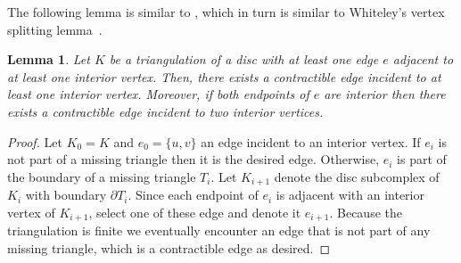 \documentclass[11pt]{article}
\newtheorem{lemma}[theorem]{Lemma}
\numberwithin{claimcounter}{theorem}
\theoremstyle{remark}
\theoremstyle{definition}
\numberwithin{theorem}{section}
\begin{document}
%
The following lemma is similar to \cite[Lemma 4.10]{keehn24-exterior}, which in turn is similar to Whiteley's vertex splitting lemma~\cite{whiteley90-split}.  
\begin{lemma}
  \label{l:interior-edge}
  Let $K$ be a triangulation of a disc with at least one edge $e$ adjacent to at least one interior vertex. 
  Then, there exists a contractible edge incident to at least one interior vertex.
  Moreover, if both endpoints of $e$ are interior then there exists a contractible edge incident to two interior vertices.
\end{lemma}
\begin{proof}
  Let $K_0 = K$ and $e_0=\{u,v\}$ an edge incident to an interior vertex.
  If $e_i$ is not part of a missing triangle then it is the desired edge.
  Otherwise, $e_i$ is part of the boundary of a missing triangle $T_i$.
  Let $K_{i+1}$ denote the disc subcomplex of $K_i$ with boundary $\partial T_i$.
  Since each endpoint of $e_i$ is adjacent with an interior vertex of $K_{i+1}$, 
  select one of these edge and denote it $e_{i+1}$. Because the triangulation is finite
  we eventually encounter an edge that is not part of any missing triangle, which is a contractible edge as desired.
\end{proof}
%
%
\end{document}
